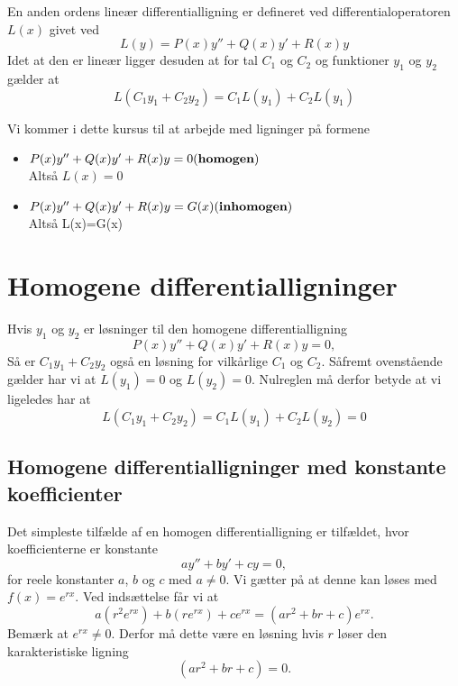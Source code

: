 \begin{definition}
  En anden ordens lineær differentialligning er defineret ved differentialoperatoren $L(x)$ givet ved
  \begin{equation}
    L(y)=P(x)y''+Q(x)y' + R(x)y  
  \end{equation}
  Idet at den er lineær ligger desuden at for tal $C_1$ og $C_2$ og funktioner $y_1$ og $y_2$ gælder at
  \begin{equation*}
    L(C_1y_1+C_2y_2) = C_1L(y_1) + C_2L(y_1)
  \end{equation*}
\end{definition}
Vi kommer i dette kursus til at arbejde med ligninger på formene
\begin{itemize}
  \item $P(x)y'' + Q(x)y' + R(x)y = 0 \hfill (\textbf{homogen})$ \\
    Altså $L(x)=0$
  \item $P(x)y'' + Q(x)y' + R(x)y = G(x)  \hfill (\textbf{inhomogen})$\\
    Altså L(x)=G(x)
\end{itemize}

\section{Homogene differentialligninger}
\begin{sæt}[Superpositionsprincippet]
  Hvis $y_1$ og $y_2$ er løsninger til den homogene differentialligning
  \begin{equation*}
    P(x)y'' + Q(x)y' + R(x)y = 0,
  \end{equation*}
  Så er $C_1y_1+C_2y_2$ også en løsning for vilkårlige $C_1$ og $C_2$.
  \tcblower
  Såfremt ovenstående gælder har vi at $L(y_1)=0$ og $L(y_2)=0$. Nulreglen må derfor betyde at vi ligeledes har at
  \begin{equation*}
    L(C_1y_1+C_2y_2) = C_1L(y_1) + C_2L(y_2) = 0
  \end{equation*}
\end{sæt}

\subsection{Homogene differentialligninger med konstante koefficienter}
Det simpleste tilfælde af en homogen differentialligning er tilfældet, hvor koefficienterne er konstante
\begin{equation}
  ay'' + by' + cy = 0,
\end{equation}
for reele konstanter $a$, $b$ og $c$ med $a \neq 0$. Vi gætter på at denne kan løses med $f(x) = e^{rx}$. Ved indsættelse får vi at
\[
  a(r^2e^{rx})+b(re^{rx})+ce^{rx} = (ar^2 + br + c)e^{rx}  
.\]
Bemærk at $e^{rx} \neq 0$. Derfor må dette være en løsning hvis $r$ løser den karakteristiske ligning
\[
  \left( ar^2 +br+c \right) = 0
.\]

